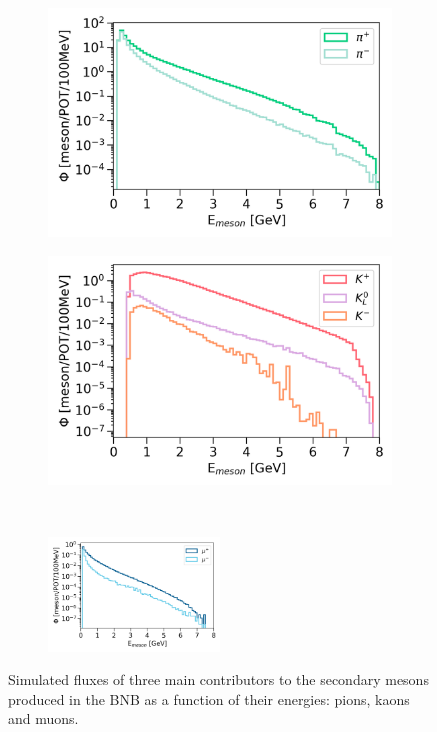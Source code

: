 \begin{figure}[htbp]
\begin{subfigure}{.5\linewidth}
\centering
\includegraphics[width=1.0\textwidth]{BNB_Meson_Pion_Flux}
\end{subfigure}%
\begin{subfigure}{.5\linewidth}
\centering
\includegraphics[width=1.0\textwidth]{BNB_Meson_Kaon_Flux}
\end{subfigure}\\[1ex]
\begin{subfigure}{\linewidth}
\centering
\includegraphics[width=0.5\textwidth]{BNB_Meson_Muon_Flux}
\end{subfigure}
\caption{
Simulated fluxes of three main contributors to the secondary mesons produced in the BNB as a function of their energies: pions, kaons and muons. 
}
\label{fig:BNB_Meson_Flux}
\end{figure}

